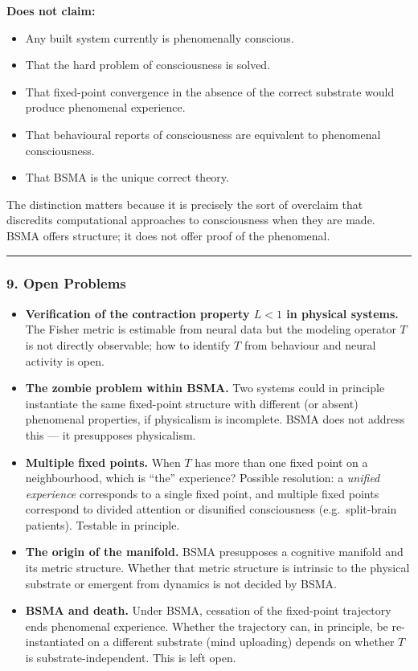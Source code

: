 \documentclass[
  11pt,
  a4paper,
]{article}
\providecommand{\tightlist}{%
  \setlength{\itemsep}{0pt}\setlength{\parskip}{0pt}}
\begin{document}
\textbf{Does not claim:}

\begin{itemize}
\tightlist
\item
  Any built system currently is phenomenally conscious.
\item
  That the hard problem of consciousness is solved.
\item
  That fixed-point convergence in the absence of the correct substrate
  would produce phenomenal experience.
\item
  That behavioural reports of consciousness are equivalent to phenomenal
  consciousness.
\item
  That BSMA is the unique correct theory.
\end{itemize}

The distinction matters because it is precisely the sort of overclaim
that discredits computational approaches to consciousness when they are
made. BSMA offers structure; it does not offer proof of the phenomenal.

\begin{center}\rule{0.5\linewidth}{0.5pt}\end{center}

\subsubsection{9. Open Problems}\label{open-problems}

\begin{itemize}
\tightlist
\item
  \textbf{Verification of the contraction property \(L < 1\) in physical
  systems.} The Fisher metric is estimable from neural data but the
  modeling operator \(T\) is not directly observable; how to identify
  \(T\) from behaviour and neural activity is open.
\item
  \textbf{The zombie problem within BSMA.} Two systems could in
  principle instantiate the same fixed-point structure with different
  (or absent) phenomenal properties, if physicalism is incomplete. BSMA
  does not address this --- it presupposes physicalism.
\item
  \textbf{Multiple fixed points.} When \(T\) has more than one fixed
  point on a neighbourhood, which is ``the'' experience? Possible
  resolution: a \emph{unified experience} corresponds to a single fixed
  point, and multiple fixed points correspond to divided attention or
  disunified consciousness (e.g.~split-brain patients). Testable in
  principle.
\item
  \textbf{The origin of the manifold.} BSMA presupposes a cognitive
  manifold and its metric structure. Whether that metric structure is
  intrinsic to the physical substrate or emergent from dynamics is not
  decided by BSMA.
\item
  \textbf{BSMA and death.} Under BSMA, cessation of the fixed-point
  trajectory ends phenomenal experience. Whether the trajectory can, in
  principle, be re-instantiated on a different substrate (mind
  uploading) depends on whether \(T\) is substrate-independent. This is
  left open.
\end{itemize}
\end{document}
